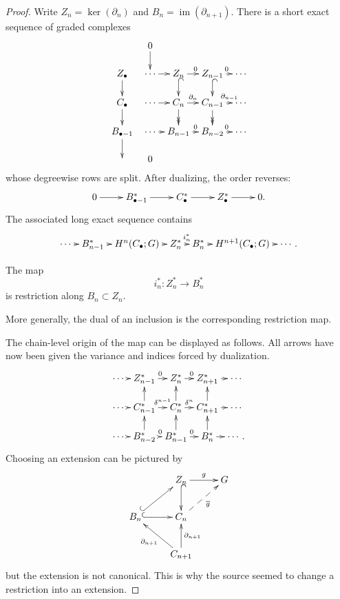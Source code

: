 \begin{proof}
Write $Z_n=\ker(\partial_n)$ and
$B_n=\operatorname{im}(\partial_{n+1})$.
There is a short exact sequence of graded
complexes
$$
\xymatrix@C=.6em@R=1.5em{
  & 0 \ar[d]
    & & \\
Z_\bullet \ar[d]
  & \cdots \ar[r]
  & Z_n \ar[r]^0 \ar@{^{(}->}[d]
  & Z_{n-1} \ar[r]^0
    \ar@{^{(}->}[d]
  & \cdots \\
C_\bullet \ar[d]
  & \cdots \ar[r]
  & C_n \ar[r]^-{\partial_n}
    \ar@{->>}[d]
  & C_{n-1}
    \ar[r]^-{\partial_{n-1}}
    \ar@{->>}[d]
  & \cdots \\
B_{\bullet-1} \ar[d]
  & \cdots \ar[r]
  & B_{n-1} \ar[r]^0
  & B_{n-2} \ar[r]^0
  & \cdots \\
  & 0
}
$$
whose degreewise rows are split.  After
dualizing, the order reverses:
$$
\xymatrix{
0 \ar[r]
  & B_{\bullet-1}^* \ar[r]
  & C_\bullet^* \ar[r]
  & Z_\bullet^* \ar[r]
  & 0.
}
$$
The associated long exact sequence contains
$$
\xymatrix@C=.5em{
\cdots \ar[r]
  & B_{n-1}^* \ar[r]
  & H^n(C_\bullet;G) \ar[r]
  & Z_n^* \ar[r]^-{i_n^*}
  & B_n^* \ar[r]
  & H^{n+1}(C_\bullet;G)
    \ar[r]
  & \cdots.
}
$$

\begin{lemma}[Claim]
\label{at-lemma-dual-inclusion-restriction}
The map
$$
i_n^*:Z_n^*\longrightarrow B_n^*
$$
is restriction along $B_n\subset Z_n$.
\end{lemma}

\begin{remark}
\label{at-remark-dual-inclusion}
More generally, the dual of an inclusion is
the corresponding restriction map.
\end{remark}

\noindent
The chain-level origin of the map can be
displayed as follows.  All arrows have now
been given the variance and indices forced
by dualization.
$$
\xymatrix@C=.35em@R=1.4em{
\cdots \ar[r]
  & Z_{n-1}^* \ar[r]^0
  & Z_n^* \ar[r]^0
  & Z_{n+1}^* \ar[r]
  & \cdots \\
\cdots \ar[r]
  & C_{n-1}^*
    \ar[r]^-{\delta^{n-1}} \ar[u]
  & C_n^* \ar[r]^-{\delta^n} \ar[u]
  & C_{n+1}^* \ar[r] \ar[u]
  & \cdots \\
\cdots \ar[r]
  & B_{n-2}^* \ar[r]^0 \ar[u]
  & B_{n-1}^* \ar[r]^0 \ar[u]
  & B_n^* \ar[r] \ar[u]
  & \cdots.
}
$$
Choosing an extension can be pictured by
$$
\xymatrix{
  & Z_n \ar[r]^-g
    \ar@{^{(}->}[d]
  & G \\
B_n \ar@{^{(}->}[ur]
  \ar@{^{(}->}[r]
  & C_n \ar@{-->}[ur]_-{\overline g} \\
  & C_{n+1}
    \ar[u]_{\partial_{n+1}}
    \ar[ul]^{\partial_{n+1}}
}
$$
but the extension is not canonical.  This
is why the source seemed to change a
restriction into an extension.


\end{proof}
